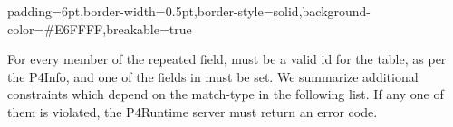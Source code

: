\documentclass[11pt]{article}
\begin{document}
{%
\begin{mdbmargintb}{6pt}{6pt}%
\begin{mdblock}{padding=6pt,border-width=0.5pt,border-style=solid,background-color=\#E6FFFF,breakable=true}%
\begin{mdpre}%
\end{mdpre}%
\end{mdblock}%
\end{mdbmargintb}%

\noindent{}For every member of the  repeated  field,  must be
a valid id for the table, as per the P4Info, and one of the fields in
 must be set. We summarize additional constraints which depend
on the match-type in the following list. If any one of them is violated, the
P4Runtime server must return an  error code.%

}
\end{document}
